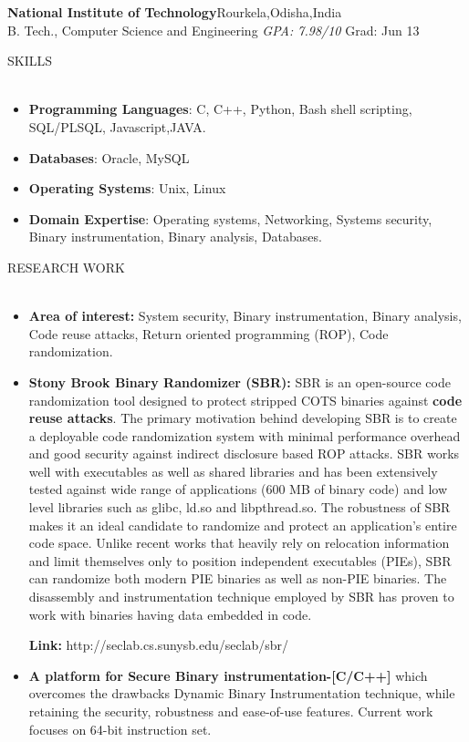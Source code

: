 \documentclass[a4paper]{article}
\newcommand{\lineunder} {
    \vspace*{-8pt} \\
    \hspace*{-18pt} \hrulefill \\
}
\newcommand{\header} [1] {
    {\hspace*{-18pt}\vspace*{6pt} \textsc{#1}}
    \vspace*{-6pt} \lineunder
}
\begin{document}
\textbf{National Institute of Technology}\hfill Rourkela,Odisha,India\\
B. Tech., Computer Science and Engineering \textit{GPA: 7.98/10} \hfill Grad: Jun 13\newline \newline
\header{SKILLS}
\begin{itemize}
  \itemsep0em
    \item \textbf{Programming Languages}: C, C++, Python, Bash shell scripting,
     SQL/PLSQL, Javascript,JAVA.
	\item \textbf{Databases}: Oracle, MySQL
	\item \textbf{Operating Systems}: Unix, Linux
    \item \textbf{Domain Expertise}: Operating systems, Networking, Systems
    security, Binary instrumentation, Binary analysis, Databases.
\end{itemize}
\header{RESEARCH WORK}
\begin{itemize}
\itemsep0em  
  \item \textbf{Area of interest:} System security, Binary instrumentation,
    Binary analysis, Code reuse attacks, Return oriented programming (ROP), Code
    randomization. 
  \item \textbf{Stony Brook Binary Randomizer (SBR):} SBR is an open-source code
    randomization tool designed to protect stripped COTS binaries against
    \textbf{code reuse attacks}. The primary motivation behind developing SBR is
    to create a deployable code randomization system with minimal performance
    overhead and good security against indirect disclosure based ROP attacks.
    SBR works well with executables as well as shared libraries and has been
    extensively tested against wide range of applications (600 MB of binary
    code) and low level libraries such as glibc, ld.so and libpthread.so. The
    robustness of SBR makes it an ideal candidate to randomize and protect an
    application's entire code space. Unlike recent works that heavily rely on
    relocation information and limit themselves only to position independent
    executables (PIEs), SBR can randomize both modern PIE binaries as well as
    non-PIE binaries. The disassembly and instrumentation technique employed by
    SBR has proven to work with binaries having data embedded in code.

    \textbf{Link:} http://seclab.cs.sunysb.edu/seclab/sbr/

  \item \textbf{A platform for Secure Binary instrumentation-[C/C++]} which
    overcomes the drawbacks Dynamic Binary Instrumentation technique, while
    retaining the security, robustness and ease-of-use features. Current work
    focuses on 64-bit instruction set.
\end{itemize}
\end{document}
